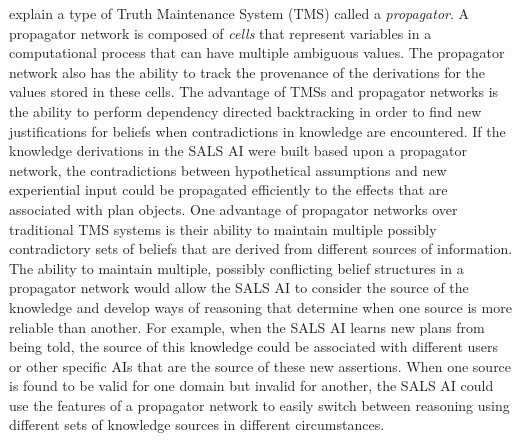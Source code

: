 \cite{radul:2009} explain a type of Truth Maintenance System (TMS)
\cite[]{doyle:1978} called a {\emph{propagator}}.  A propagator
network is composed of {\emph{cells}} that represent variables in a
computational process that can have multiple ambiguous values.  The
propagator network also has the ability to track the provenance of the
derivations for the values stored in these cells.  The advantage of
TMSs and propagator networks is the ability to perform dependency
directed backtracking in order to find new justifications for beliefs
when contradictions in knowledge are encountered.  If the knowledge
derivations in the SALS AI were built based upon a propagator network,
the contradictions between hypothetical assumptions and new
experiential input could be propagated efficiently to the effects that
are associated with plan objects.  One advantage of propagator
networks over traditional TMS systems is their ability to maintain
multiple possibly contradictory sets of beliefs that are derived from
different sources of information.  The ability to maintain multiple,
possibly conflicting belief structures in a propagator network would
allow the SALS AI to consider the source of the knowledge and develop
ways of reasoning that determine when one source is more reliable than
another.  For example, when the SALS AI learns new plans from being
told, the source of this knowledge could be associated with different
users or other specific AIs that are the source of these new
assertions.  When one source is found to be valid for one domain but
invalid for another, the SALS AI could use the features of a
propagator network to easily switch between reasoning using different
sets of knowledge sources in different circumstances.



